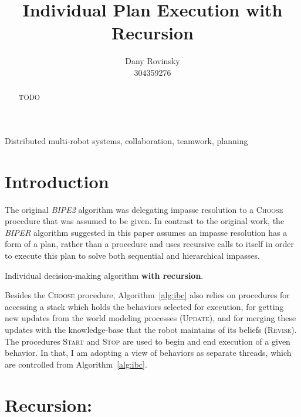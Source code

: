 \documentclass[3p,times]{elsarticle} %
\newcommand{\noun}[1]{\textsc{#1}}
\begin{document}
\begin{frontmatter}
\title{Individual Plan Execution with Recursion}
\author{Dany Rovinsky\\304359276}
\address{Computer Science Department\\
Bar Ilan University, Israel}

\begin{keyword}
Distributed multi-robot systems, collaboration, teamwork, planning
\end{keyword}

\begin{abstract}
TODO
\end{abstract}

\end{frontmatter}

\section{Introduction}

The original \textit{BIPE2} algorithm was delegating impasse resolution to a \noun{Choose} procedure that was assumed to be given. In contrast to the original work, the \textit{BIPER} algorithm suggested in this paper assumes an impasse resolution has a form of a plan, rather than a procedure and uses recursive calls to itself in order to execute this plan to solve both sequential and hierarchical impasses.

\begin{algorithm}[htbp]
\caption{Individual decision-making algorithm \textbf{with recursion}.}
\label{alg:ibc}

\end{algorithm}

Besides the \noun{Choose} procedure, Algorithm~\ref{alg:ibc} also relies on procedures for accessing a stack
which holds the behaviors selected for execution, for getting new updates from the world modeling processes
(\noun{Update}), and for merging these updates with the knowledge-base that the robot maintains of its
beliefs (\noun{Revise}).  The procedures \noun{Start} and \noun{Stop} are used to begin and end
execution of a given behavior. In that, I am adopting a view of behaviors as separate threads,
which are controlled from Algorithm~\ref{alg:ibc}.

\section{Recursion:}
\end{document}
